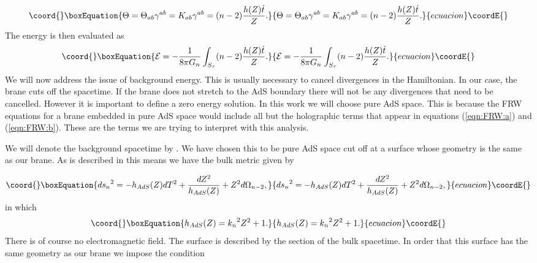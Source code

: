 \documentclass[a4paper,12pt]{article}
\begin{document}
\begin{equation}\coord{}\boxEquation{
\Theta=\Theta_{ab} \gamma^{ab}=K_{ab} \gamma^{ab} = (n-2)\frac{h(Z)
\dot{t}}{Z}.
}{
\Theta=\Theta_{ab} \gamma^{ab}=K_{ab} \gamma^{ab} = (n-2)\frac{h(Z)
\dot{t}}{Z}.
}{ecuacion}\coordE{}\end{equation}
The energy is then evaluated as
\begin{equation}\coord{}\boxEquation{
\mathcal{E}= -\frac{1}{8 \pi G_n} \int_{S_{\tau}} (n-2)\frac{h(Z)
\dot{t}}{Z}.
}{
\mathcal{E}= -\frac{1}{8 \pi G_n} \int_{S_{\tau}} (n-2)\frac{h(Z)
\dot{t}}{Z}.
}{ecuacion}\coordE{}\end{equation}
We will now address the issue of background energy. This is usually
necessary to cancel divergences in the Hamiltonian.  In our case, the
brane cuts off the spacetime. If the brane does not stretch to the AdS
boundary there will not be any divergences that need to be
cancelled. However it is important to define a zero energy
solution. In this work we will choose pure AdS space. This is because
the FRW equations for a brane embedded in pure AdS space would include
all but the holographic terms that appear in equations
(\ref{eqn:FRW:a}) and (\ref{eqn:FRW:b}). These are the terms we are
trying to interpret with this analysis.

We will denote the background spacetime by \coordHE{}.  We have
chosen this to be pure AdS space cut off at a surface \coordHE{} whose geometry is the same as our brane. As is
described in \cite{Padilla:CFT} this means we have the bulk metric
given by

\begin{equation}\coord{}\boxEquation{ \label{eqn:AdSmetric}
{ds_n}^2 = -h_{AdS}(Z)dT^2 + \frac{dZ^2}{h_{AdS}(Z)} + Z^2
d\Omega_{n-2},
}{ {ds_n}^2 = -h_{AdS}(Z)dT^2 + \frac{dZ^2}{h_{AdS}(Z)} + Z^2
d\Omega_{n-2},
}{ecuacion}\coordE{}\end{equation}
in which
\begin{equation}\coord{}\boxEquation{ \label{eqn:h_AdS(Z)}
h_{AdS}(Z) = {k_n}^2 Z^2 + 1.
}{ h_{AdS}(Z) = {k_n}^2 Z^2 + 1.
}{ecuacion}\coordE{}\end{equation}
There is of course no electromagnetic field. The surface  \coordHE{} is described by the section \coordHE{} of the bulk spacetime. In order that this surface
has the same geometry as our brane we impose the condition
\end{document}
